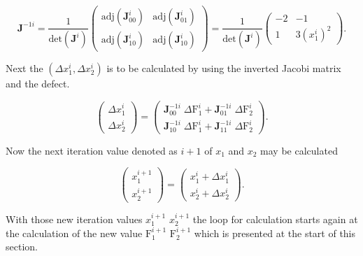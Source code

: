 \documentclass[a4paper, twoside, 11pt]{article}
\begin{document}
    \begin{equation}
        \textbf{J}^{-1i} =
        \frac{1}{\text{det}(\textbf{J}^i)}
        \begin{pmatrix}
            \text{adj}(\textbf{J}^i_{00}) & \text{adj}(\textbf{J}^i_{01})\\
            \text{adj}(\textbf{J}^i_{10}) & \text{adj}(\textbf{J}^i_{10})
        \end{pmatrix}
        =
        \frac{1}{\text{det}(\textbf{J}^i)}
        \begin{pmatrix}
            -2 & -1\\
            1 & 3 (x_1^i)^2
        \end{pmatrix}.
    \end{equation}
\par
    Next the $(\Delta x_1^i, \Delta x_2^i)$ is to be calculated by using the inverted Jacobi matrix and the defect.

    \begin{equation}
        \begin{pmatrix}
            \Delta x_1^i \\
            \Delta x_2^i
        \end{pmatrix}
        =
        \begin{pmatrix}
            \textbf{J}_{00}^{-1i} \;\Delta \text{F}_1^i + \textbf{J}_{01}^{-1i} \;\Delta \text{F}_2^i\\ 
            \textbf{J}_{10}^{-1i} \;\Delta \text{F}_1^i + \textbf{J}_{11}^{-1i} \;\Delta \text{F}_2^i
        \end{pmatrix}.
    \end{equation}

    \par
    Now the next iteration value denoted as $i+1$ of $x_1$ and $x_2$ may be calculated

    \begin{equation}
        \begin{pmatrix}
            x_1^{i+1}\\
            x_2^{i+1}
        \end{pmatrix}
        =
        \begin{pmatrix}
            x_1^i + \Delta x_1^i\\
            x_2^i + \Delta x_2^i
        \end{pmatrix}.
    \end{equation}
\par
    With those new iteration values $x_1^{i+1}$ $x_2^{i+1}$ the loop for calculation starts again at the calculation of the new value $\text{F}_1^{i+1}$ $\text{F}_2^{i+1}$ which is presented at the start of this section.
\end{document}
